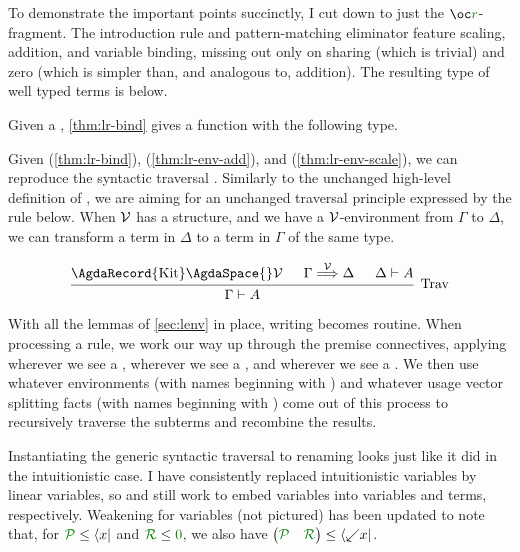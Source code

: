 
To demonstrate the important points succinctly, I cut \name{} down to just the
$\oc\gr r$-fragment.
The introduction rule and pattern-matching eliminator feature scaling, addition,
and variable binding, missing out only on sharing (which is trivial) and zero
(which is simpler than, and analogous to, addition).
The resulting type of well typed terms is below.


Given a \AgdaSpace{}\AgdaBound{$\V$},
\cref{thm:lr-bind} gives a function with the following type.


Given  (\cref{thm:lr-bind}), 
(\cref{thm:lr-env-add}), and  (\cref{thm:lr-env-scale}),
we can reproduce the syntactic traversal .
Similarly to the unchanged high-level definition of , we are
aiming for an unchanged traversal principle expressed by the rule below.
When $\V$ has a  structure, and we have a $\V$-environment from
$\Gamma$ to $\Delta$, we can transform a term in $\Delta$ to a term in $\Gamma$
of the same type.

\[
  \begin{prooftree}
    \hypo{\text{\AgdaRecord{Kit}\AgdaSpace{}}\V}
    \hypo{\Gamma \env\V \Delta}
    \hypo{\Delta \vdash A}
    \infer3[Trav]{\Gamma \vdash A}
  \end{prooftree}
\]

With all the lemmas of \cref{sec:lenv} in place, writing 
becomes routine.
When processing a rule, we work our way up through the
premise connectives, applying  wherever we see a
,  wherever we see a
, and  wherever we see a
.
We then use whatever environments (with names beginning with
\AgdaBound{$\rho$}) and whatever usage vector splitting facts (with names
beginning with ) come out of this process to recursively
traverse the subterms and recombine the results.


Instantiating the generic syntactic traversal  to renaming
looks just like it did in the intuitionistic case.
I have consistently replaced intuitionistic variables by linear variables, so
 and  still work to embed
variables into variables and terms, respectively.
Weakening for variables  (not pictured) has been
updated to note that, for $\grP \leq \bra x$ and $\grR \leq \gr0$, we also have
$\begin{pmatrix} \grP & \grR \end{pmatrix} \leq \bra{{\swarrow}x}$.

